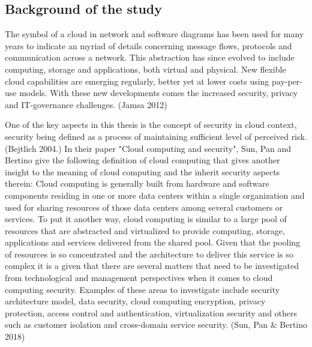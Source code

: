 \documentclass{article}
\begin{document}
\subsection{Background of the study}
The symbol of a cloud in network and software diagrams has been used for many years to indicate an myriad of details concerning message flows, protocols and communication across a network. This abstraction has since evolved to include computing, storage and applications, both virtual and physical. New flexible cloud capabilities are emerging regularly, better yet at lower costs using pay-per-use models. With these new developments comes the increased security, privacy and IT-governance challenges. (Jamsa 2012)
\par
One of the key aspects in this thesis is the concept of security in cloud context, security being defined as a process of maintaining sufficient level of perceived risk. (Bejtlich 2004.)
In their paper "Cloud computing and security", Sun, Pan and Bertino give the following definition of cloud computing that gives another insight to the meaning of cloud computing and the inherit security aspects therein: Cloud computing is generally built from hardware and software components residing in one or more data centers within a single organization and used for sharing resources of those data centers among several customers or services. To put it another way, cloud computing is similar to a large pool of resources that are abstracted and virtualized to provide computing, storage, applications and services delivered from the shared pool. Given that the pooling of resources is so concentrated and the architecture to deliver this service is so complex it is a given that there are several matters that need to be investigated from technological and management perspectives when it comes to cloud computing security. Examples of these areas to investigate include security architecture model, data security, cloud computing encryption, privacy protection, access control and authentication, virtualization security and others such as customer isolation and cross-domain service security. (Sun, Pan \& Bertino 2018)
\par 
\end{document}
